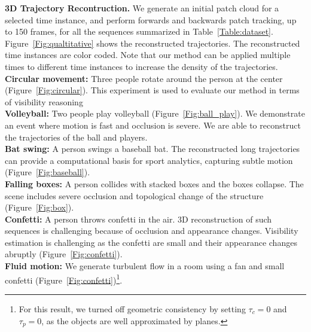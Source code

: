 \documentclass[10pt,twocolumn,letterpaper]{article}
\begin{document}
\noindent \textbf{3D Trajectory Recontruction.}
We generate an initial patch cloud for a selected time instance, and perform forwards and backwards patch tracking, up to 150 frames, for all the sequences summarized in Table~\ref{Table:dataset}. Figure~\ref{Fig:qualtitative} shows the reconstructed trajectories. The reconstructed time instances are color coded. Note that our method can be applied multiple times to different time instances to increase the density of the trajectories. \\
\textbf{Circular movement:} Three people rotate around the person at the center (Figure~\ref{Fig:circular}). This experiment is used to evaluate our method in terms of visibility reasoning\\
\textbf{Volleyball:} Two people play volleyball (Figure~\ref{Fig:ball_play}). We demonstrate an event where motion is fast and occlusion is severe. We are able to reconstruct the trajectories of the ball and players.\\
\textbf{Bat swing:} A person swings a baseball bat. The reconstructed long trajectories can provide a computational basis for sport analytics, capturing subtle motion (Figure~\ref{Fig:baseball}).\\
\textbf{Falling boxes:} A person collides with stacked boxes and the boxes collapse. The scene includes severe occlusion and topological change of the structure (Figure~\ref{Fig:box}).\\
\textbf{Confetti:} A person throws confetti in the air. 3D reconstruction of such sequences is challenging because of occlusion and appearance changes. Visibility estimation is challenging as the confetti are small and their appearance changes abruptly (Figure~\ref{Fig:confetti}). \\
\textbf{Fluid motion:} We generate turbulent flow in a room using a fan and small confetti (Figure~\ref{Fig:confetti})\footnote{For this result, we turned off geometric consistency by setting $\tau_c = 0$ and $\tau_p = 0$, as the objects are well approximated by planes.}. 
\end{document}
